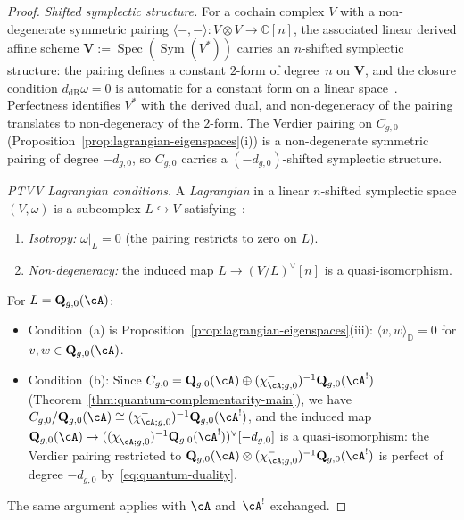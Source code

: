 \begin{proof}
\emph{Shifted symplectic structure.}
For a cochain complex $V$ with a non-degenerate symmetric pairing
$\langle -,- \rangle \colon V \otimes V \to \mathbb{C}[n]$,
the associated linear derived affine scheme
$\mathbf{V} := \operatorname{Spec}(\operatorname{Sym}(V^*))$
carries an $n$-shifted symplectic structure: the pairing defines a
constant $2$-form of degree~$n$ on $\mathbf{V}$, and the closure
condition $d_{\mathrm{dR}}\omega = 0$ is automatic for a constant
form on a linear space~\cite[Example~1.4]{PTVV13}.
Perfectness identifies $V^*$ with the derived dual, and
non-degeneracy of the pairing translates to non-degeneracy of the
$2$-form.
The Verdier pairing on $C_{g,0}$
(Proposition~\ref{prop:lagrangian-eigenspaces}(i)) is a
non-degenerate symmetric pairing of degree $-d_{g,0}$, so $C_{g,0}$
carries a $(-d_{g,0})$-shifted symplectic structure.

\emph{PTVV Lagrangian conditions.}
A \emph{Lagrangian} in a linear $n$-shifted symplectic space
$(V, \omega)$ is a subcomplex $L \hookrightarrow V$
satisfying~\cite[Definition~2.8]{PTVV13}:
\begin{enumerate}[label=(\alph*)]
\item \emph{Isotropy:} $\omega|_L = 0$ (the pairing restricts to
 zero on $L$).
\item \emph{Non-degeneracy:} the induced map
 $L \to (V/L)^{\vee}[n]$ is a quasi-isomorphism.
\end{enumerate}
For $L = \mathbf{Q}_{g,0}(\cA)$:
\begin{itemize}
\item Condition~(a) is
 Proposition~\ref{prop:lagrangian-eigenspaces}(iii):
 $\langle v, w \rangle_{\mathbb{D}} = 0$ for
 $v, w \in \mathbf{Q}_{g,0}(\cA)$.
\item Condition~(b): Since
 $C_{g,0}=\mathbf{Q}_{g,0}(\cA)\oplus
 (\chi^-_{\cA;g,0})^{-1}\mathbf{Q}_{g,0}(\cA^!)$
 (Theorem~\ref{thm:quantum-complementarity-main}), we have
 $C_{g,0}/\mathbf{Q}_{g,0}(\cA)\cong
 (\chi^-_{\cA;g,0})^{-1}\mathbf{Q}_{g,0}(\cA^!)$, and the induced map
 $\mathbf{Q}_{g,0}(\cA)\to
 ((\chi^-_{\cA;g,0})^{-1}\mathbf{Q}_{g,0}(\cA^!))^{\vee}[-d_{g,0}]$ is a
 quasi-isomorphism: the Verdier pairing restricted to
 $\mathbf{Q}_{g,0}(\cA)\otimes
 (\chi^-_{\cA;g,0})^{-1}\mathbf{Q}_{g,0}(\cA^!)$ is perfect of degree $-d_{g,0}$
 by~\eqref{eq:quantum-duality}.
\end{itemize}
The same argument applies with $\cA$ and~$\cA^!$ exchanged.
\end{proof}

